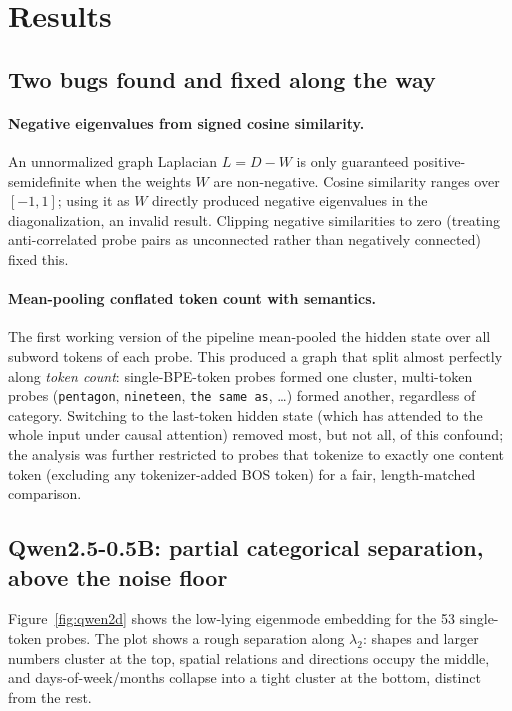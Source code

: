 \documentclass[11pt]{article}
\begin{document}
\section{Results}
\label{sec:results}

\subsection{Two bugs found and fixed along the way}

\paragraph{Negative eigenvalues from signed cosine similarity.}
\label{sec:negeig}
An unnormalized graph Laplacian $L = D - W$ is only guaranteed
positive-semidefinite when the weights $W$ are non-negative. Cosine similarity
ranges over $[-1, 1]$; using it as $W$ directly produced negative eigenvalues
in the diagonalization, an invalid result. Clipping negative similarities to
zero (treating anti-correlated probe pairs as unconnected rather than
negatively connected) fixed this.

\paragraph{Mean-pooling conflated token count with semantics.}
\label{sec:tokenlen}
The first working version of the pipeline mean-pooled the hidden state over
all subword tokens of each probe. This produced a graph that split almost
perfectly along \emph{token count}: single-BPE-token probes formed one
cluster, multi-token probes (\texttt{pentagon}, \texttt{nineteen}, \texttt{the
same as}, \ldots) formed another, regardless of category. Switching to the
last-token hidden state (which has attended to the whole input under causal
attention) removed most, but not all, of this confound; the analysis was
further restricted to probes that tokenize to exactly one content token
(excluding any tokenizer-added BOS token) for a fair, length-matched
comparison.

\subsection{Qwen2.5-0.5B: partial categorical separation, above the noise floor}

Figure~\ref{fig:qwen2d} shows the low-lying eigenmode embedding for the 53
single-token probes. The plot shows a rough separation along $\lambda_2$:
shapes and larger numbers cluster at the top, spatial relations and
directions occupy the middle, and days-of-week/months collapse into a tight
cluster at the bottom, distinct from the rest.
\end{document}
